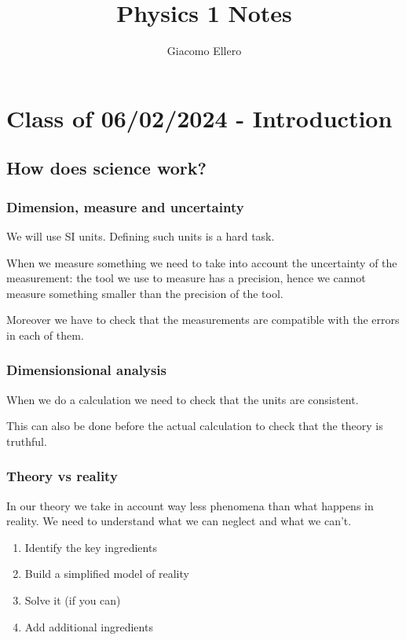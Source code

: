 \documentclass[10pt]{extarticle}
\title{Physics 1 Notes}
\author{Giacomo Ellero}
\begin{document}
\maketitle
\tableofcontents
\clearpage

\section{Class of 06/02/2024 - Introduction}

\subsection{How does science work?}

\subsubsection{Dimension, measure and uncertainty}

We will use SI units. Defining such units is a hard task.

When we measure something we need to take into account the uncertainty of the measurement:
the tool we use to measure has a precision, hence we cannot measure something smaller than the precision of the tool.

Moreover we have to check that the measurements are compatible with the errors in each of them.

\subsubsection{Dimensionsional analysis}

When we do a calculation we need to check that the units are consistent.

This can also be done before the actual calculation to check that the theory is truthful.

\subsubsection{Theory vs reality}

In our theory we take in account way less phenomena than what happens in reality.
We need to understand what we can neglect and what we can't.

\begin{enumerate}
  \item Identify the key ingredients
  \item Build a simplified model of reality
  \item Solve it (if you can)
  \item Add additional ingredients
\end{enumerate}
\end{document}
